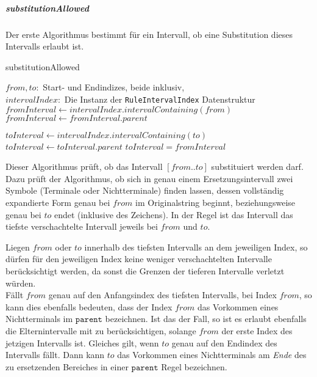 \subparagraph{substitutionAllowed}

Der erste Algorithmus bestimmt für ein Intervall, ob eine Substitution dieses Intervalls erlaubt ist. 

\begin{algorithm}
    \begin{algorithmic}
        \caption{substitutionAllowed}
        \REQUIRE $from, to: $ Start- und Endindizes, beide inklusiv,\\$intervalIndex: $ Die Instanz der \texttt{RuleIntervalIndex} Datenstruktur
        \STATE $ $
        \STATE $fromInterval \leftarrow intervalIndex.intervalContaining(from)$
            \STATE $fromInterval \leftarrow fromInterval.parent$
        \ENDWHILE

            \RETURN \FALSE
        \ENDIF

        \STATE $toInterval \leftarrow intervalIndex.intervalContaining(to)$
            \STATE $toInterval \leftarrow toInterval.parent$
        \ENDWHILE
        \RETURN $toInterval = fromInterval$
    \end{algorithmic}
\end{algorithm}
Dieser Algorithmus prüft, ob das Intervall $[from..to]$ substituiert werden darf. Dazu prüft der Algorithmus, ob sich in genau einem Ersetzungsintervall zwei Symbole (Terminale oder Nichtterminale) finden lassen, dessen vollständig expandierte Form genau bei $from$ im Originalstring beginnt, beziehungsweise genau bei $to$ endet (inklusive des Zeichens).
In der Regel ist das Intervall das tiefste verschachtelte Intervall jeweils bei $from$ und $to$. 

Liegen $from$ oder $to$ innerhalb des tiefsten Intervalls an dem jeweiligen Index, so dürfen für den jeweiligen Index keine weniger verschachtelten Intervalle berücksichtigt werden, da sonst die Grenzen der tieferen Intervalle verletzt würden.\\ 
Fällt $from$ genau auf den Anfangsindex des tiefsten Intervalls, bei Index $from$, so kann dies ebenfalls bedeuten, dass der Index $from$ das Vorkommen eines Nichtterminals im $\texttt{parent}$ bezeichnen. Ist das der Fall, so ist es erlaubt ebenfalls die Elternintervalle mit zu berücksichtigen, solange $from$ der erste Index des jetzigen Intervalls ist. Gleiches gilt, wenn $to$ genau auf den Endindex des Intervalls fällt. Dann kann $to$ das Vorkommen eines Nichtterminals am \textit{Ende} des zu ersetzenden Bereiches in einer $\texttt{parent}$ Regel bezeichnen.

